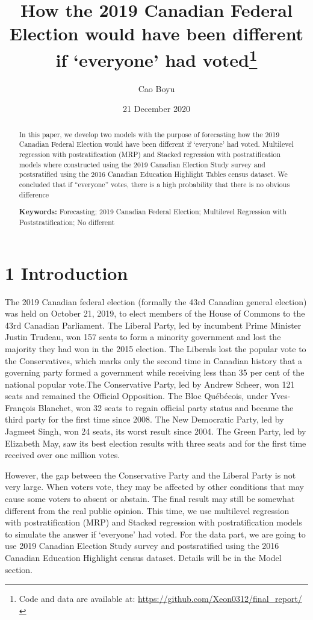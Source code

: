\documentclass[
  12pt,
]{article}
\title{How the 2019 Canadian Federal Election would have been different if
`everyone' had voted\thanks{Code and data are available at:
\url{https://github.com/Xeon0312/final_report/}}}
\author{Cao Boyu}
\date{21 December 2020}
\begin{document}
\maketitle
\begin{abstract}
In this paper, we develop two models with the purpose of forecasting how
the 2019 Canadian Federal Election would have been different if
`everyone' had voted. Multilevel regression with postratification (MRP)
and Stacked regression with postratification models where constructed
using the 2019 Canadian Election Study survey and postsratified using
the 2016 Canadian Education Highlight Tables census dataset. We
concluded that if ``everyone'' votes, there is a high probability that
there is no obvious difference

\textbf{Keywords:} Forecasting; 2019 Canadian Federal Election;
Multilevel Regression with Poststratification; No different
\end{abstract}

\hypertarget{introduction}{%
\section{1 Introduction}\label{introduction}}

The 2019 Canadian federal election (formally the 43rd Canadian general
election) was held on October 21, 2019, to elect members of the House of
Commons to the 43rd Canadian Parliament. The Liberal Party, led by
incumbent Prime Minister Justin Trudeau, won 157 seats to form a
minority government and lost the majority they had won in the 2015
election. The Liberals lost the popular vote to the Conservatives, which
marks only the second time in Canadian history that a governing party
formed a government while receiving less than 35 per cent of the
national popular vote.The Conservative Party, led by Andrew Scheer, won
121 seats and remained the Official Opposition. The Bloc Québécois,
under Yves-François Blanchet, won 32 seats to regain official party
status and became the third party for the first time since 2008. The New
Democratic Party, led by Jagmeet Singh, won 24 seats, its worst result
since 2004. The Green Party, led by Elizabeth May, saw its best election
results with three seats and for the first time received over one
million votes.

However, the gap between the Conservative Party and the Liberal Party is
not very large. When voters vote, they may be affected by other
conditions that may cause some voters to absent or abstain. The final
result may still be somewhat different from the real public opinion.
This time, we use multilevel regression with postratification (MRP) and
Stacked regression with postratification models to simulate the answer
if `everyone' had voted. For the data part, we are going to use 2019
Canadian Election Study survey and postsratified using the 2016 Canadian
Education Highlight census dataset. Details will be in the Model
section.
\end{document}
